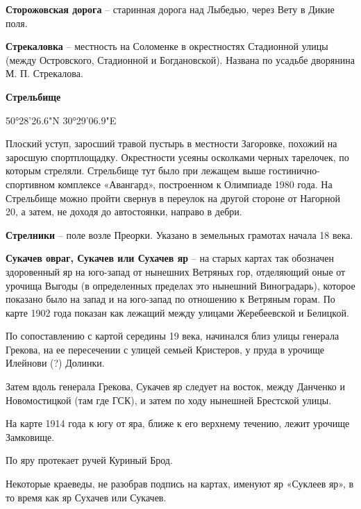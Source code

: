 \medskip

\textbf{Сторожовская дорога} – старинная дорога над Лыбедью, через Вету в Дикие поля.\\

\medskip

\textbf{Стрекаловка} – местность на Соломенке в окрестностях Стадионной улицы (между Островского, Стадионной и Богдановской). Названа по усадьбе дворянина М. П. Стрекалова.\\

\medskip

\textbf{Стрельбище}

50°28'26.6"N 30°29'06.9"E

Плоский уступ, заросший травой пустырь в местности Загоровке, похожий на заросшую спортплощадку. Окрестности усеяны осколками черных тарелочек, по которым стреляли. Стрельбище тут было при лежащем выше  гости\-нично-спортивном комплексе «Авангард», построенном к Олимпиаде 1980 года. На Стрельбище можно пройти свернув в переулок на другой стороне от Нагорной 20, а затем, не доходя до автостоянки, направо в дебри.\\

\medskip

\textbf{Стрелники} – поле возле Преорки. Указано в земельных грамотах начала 18 века.\\

\medskip

\textbf{Сукачев овраг, Сукачев или Сухачев яр} – на старых картах так обозначен здоровенный яр на юго-запад от нынешних Ветряных гор, отделяющий оные от урочища Выгоды (в определенных пределах это нынешний Виноградарь), которое показано было на запад и на юго-запад по отношению к Ветряным горам. По карте 1902 года показан как лежащий между улицами Жеребеевской и Белицкой.

По сопоставлению с картой середины 19 века, начинался близ улицы генерала Грекова, на ее пересечении с улицей семьей Кристеров, у пруда в урочище Илейнови (?) Долинки.

Затем вдоль генерала Грекова, Сукачев яр следует на восток, между Данченко и Новомостицкой (там где ГСК), и затем по ходу нынешней Брестской улицы.

На карте 1914 года к югу от яра, ближе к его верхнему течению, лежит урочище Замковище.

По яру протекает ручей Куриный Брод.

Некоторые краеведы, не разобрав подпись на картах, именуют яр «Суклеев яр», в то время как яр Сухачев или Сукачев.\\

